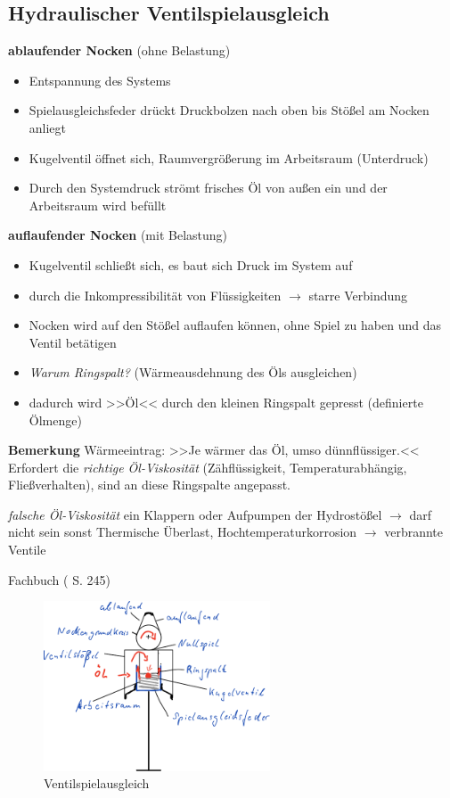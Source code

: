 \subsection{Hydraulischer
Ventilspielausgleich}\label{hydraulischer-ventilspielausgleich}

\textbf{ablaufender Nocken} (ohne Belastung)

\begin{itemize}
\item
  Entspannung des Systems
\item
  Spielausgleichsfeder drückt Druckbolzen nach oben bis Stößel am Nocken
  anliegt
\item
  Kugelventil öffnet sich, Raumvergrößerung im Arbeitsraum (Unterdruck)
\item
  Durch den Systemdruck strömt frisches Öl von außen ein und der
  Arbeitsraum wird befüllt
\end{itemize}

\textbf{auflaufender Nocken} (mit Belastung)

\begin{itemize}
\item
  Kugelventil schließt sich, es baut sich Druck im System auf
\item
  durch die Inkompressibilität von Flüssigkeiten $\to$ starre
  Verbindung
\item
  Nocken wird auf den Stößel auflaufen können, ohne Spiel zu haben und
  das Ventil betätigen
\item
  \emph{Warum Ringspalt?} (Wärmeausdehnung des Öls ausgleichen)
\item
  dadurch wird >>Öl<< durch den kleinen Ringspalt gepresst (definierte
  Ölmenge)
\end{itemize}

\textbf{Bemerkung} Wärmeeintrag: >>Je wärmer das Öl, umso
dünnflüssiger.<< Erfordert die \emph{richtige Öl-Viskosität}
(Zähflüssigkeit, Temperaturabhängig, Fließverhalten), sind an diese
Ringspalte angepasst.

\emph{falsche Öl-Viskosität} ein Klappern oder Aufpumpen der Hydrostößel
$\to$ darf nicht sein sonst Thermische Überlast,
Hochtemperaturkorrosion $\to$ verbrannte Ventile

Fachbuch (\textcite{brand:2020:fachkundeKfz} S. 245)

\begin{figure}[!ht]%
\centering
\includegraphics[width=0.6\textwidth]{images/Skizze/04_Ventilspielausgleich_Skizze.pdf}
\caption{Ventilspielausgleich}
\end{figure}

